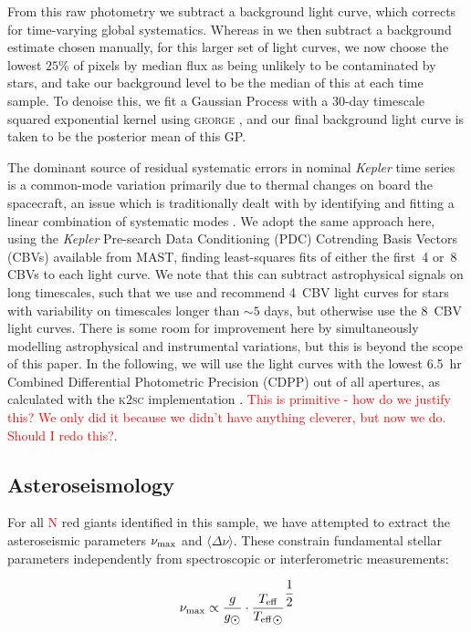 \documentclass[a4paper,fleqn,usenatbib]{mnras}
\newcommand{\numax}{\mbox{$\nu_{\rm max}$}\xspace}
\newcommand{\Dnu}{\mbox{$\Delta \nu$}\xspace}
\newcommand{\teff}{\mbox{$T_{\rm eff}$}\xspace}
\newcommand{\kepler}{\emph{Kepler}\xspace}
\begin{document}
From this raw photometry we subtract a background light curve, which corrects for time-varying global systematics. Whereas in \citet{smear} we then subtract a background estimate chosen manually, for this larger set of light curves, we now choose the lowest $25\%$ of pixels by median flux as being unlikely to be contaminated by stars, and take our background level to be the median of this at each time sample. To denoise this, we fit a Gaussian Process with a 30-day timescale squared exponential kernel using \textsc{george} \citep{hodlr}, and our final background light curve is taken to be the posterior mean of this GP. 

The dominant source of residual systematic errors in nominal \kepler time series is a common-mode variation primarily due to thermal changes on board the spacecraft, an issue which is traditionally dealt with by identifying and fitting a linear combination of systematic modes \citep{pdc0,pdc1,pdc2,petigura}. We adopt the same approach here, using the \kepler Pre-search Data Conditioning (PDC) Cotrending Basis Vectors (CBVs) available from MAST, finding least-squares fits of  either the first~4 or~8 CBVs to each light curve. We note that this can subtract astrophysical signals on long timescales, such that we use and recommend 4~CBV light curves for stars with variability on timescales longer than $\sim 5$ days, but otherwise use the 8~CBV light curves. There is some room for improvement here by simultaneously modelling astrophysical and instrumental variations, but this is beyond the scope of this paper. In the following, we will use the light curves with the lowest 6.5~hr Combined Differential Photometric Precision (CDPP) \citep{cdpp} out of all apertures, as calculated with the \textsc{k2sc} implementation \citep{k2sc}. \textcolor{red}{This is primitive - how do we justify this? We only did it because we didn't have anything cleverer, but now we do. Should I redo this?}. 
\subsection{Asteroseismology}
\label{asteroseismology}

For all \textcolor{red}{N} red giants identified in this sample, we have attempted to extract the asteroseismic parameters \numax and $\langle \Dnu \rangle$. These constrain fundamental stellar parameters independently from spectroscopic or interferometric measurements: 

\begin{equation}
\numax \propto \dfrac{g}{g_{\sun}} \cdot \dfrac{\teff}{\teff_{\sun}}^{\dfrac{1}{2}}
\end{equation}
\end{document}
